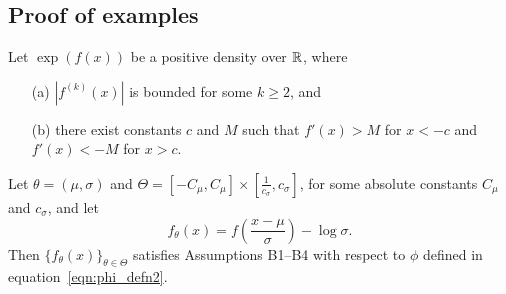 \documentclass{article}
\begin{document}
\subsection{Proof of examples}
\label{sec:appendix_examples}

\begin{proposition}
\label{prop:scale_location_family}
Let $\exp( f(x))$ be a positive density over ${\mathbb R}$, where
\begin{itemize}
\item[(a)] $|f^{(k)}(x)|$ is bounded for some $k \geq 2$, and
\item[(b)] there exist constants $c$ and $M$ such that $f'(x) > M$ for $x < -c$ and $f'(x) < - M$ for $x > c$. 
\end{itemize}
Let $\theta = (\mu, \sigma)$ and $\Theta = [- C_{\mu}, C_{\mu}] \times [\frac{1}{c_{\sigma}}, c_{\sigma}]$, for some absolute constants $C_{\mu}$ and $c_{\sigma}$, and let
\[
f_\theta (x) = f\left( \frac{x - \mu}{\sigma} \right) - \log \sigma.
\]
Then $\{ f_\theta(x) \}_{\theta \in \Theta}$ satisfies Assumptions B1--B4 with respect to $\phi$ defined in equation~\eqref{eqn:phi_defn2}.
\end{proposition}
\end{document}
